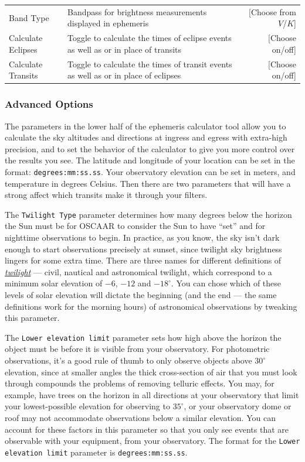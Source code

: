 \documentclass[a4paper]{article}
\newcommand{\code}[1]{\texttt{#1}}
\begin{document}
\begin{table}[H]
\begin{tabular}{p{0.8in} |  p{3.2in} r}
Band Type & Bandpass for brightness measurements displayed in ephemeris &  [Choose from $V$/$K$]\\
Calculate Eclipses & Toggle to calculate the times of eclipse events as well as or in place of transits &  [Choose on/off]\\
Calculate Transits & Toggle to calculate the times of transit events as well as or in place of eclipses &  [Choose on/off]\\
\hline 
\end{tabular}
\end{table}

\pagebreak

\subsubsection{Advanced Options}

The parameters in the lower half of the ephemeris calculator tool allow you to calculate the sky altitudes and directions at ingress and egress with extra-high precision, and to set the behavior of the calculator to give you more control over the results you see. The latitude and longitude of your location can be set in the format: \code{degrees:mm:ss.ss}. Your observatory elevation can be set in meters, and temperature in degrees Celsius. Then there are two parameters that will have a strong affect which transits make it through your filters. 

The \code{Twilight Type} parameter determines how many degrees below the horizon the Sun must be for OSCAAR to consider the Sun to have ``set'' and for nighttime observations to begin. In practice, as you know, the sky isn't dark enough to start observations precisely at sunset, since twilight sky brightness lingers for some extra time. There are three names for different definitions of \href{http://en.wikipedia.org/wiki/Twilight#Definitions}{\textit{twilight}} --- civil, nautical and astronomical twilight, which correspond to a minimum solar elevation of $-6$, $-12$ and $-18^{\circ}$. You can chose which of these levels of solar elevation will dictate the beginning (and the end --- the same definitions work for the morning hours) of astronomical observations by tweaking this parameter. 

The \code{Lower elevation limit} parameter sets how high above the horizon the object must be before it is visible from your observatory. For photometric observations, it's a good rule of thumb to only observe objects above $30^{\circ}$ elevation, since at smaller angles the thick cross-section of air that you must look through compounds the problems of removing telluric effects.  You may, for example, have trees on the horizon in all directions at your observatory that limit your lowest-possible elevation for observing to $35^{\circ}$, or your observatory dome or roof may not accommodate observations below a similar elevation. You can account for these factors in this parameter so that you only see events that are observable with your equipment, from your observatory. The format for the \code{Lower elevation limit} parameter is  \code{degrees:mm:ss.ss}.
\end{document}
